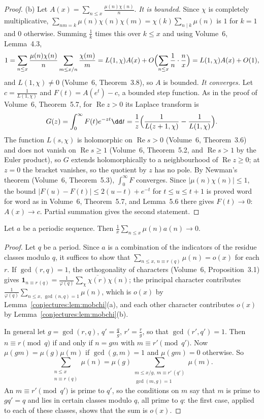 \begin{proof}
(b) Let $A(x)=\sum_{n\le x}\frac{\mu(n)\chi(n)}n$. \emph{It is bounded.} Since $\chi$ is completely multiplicative, $\sum_{nm=k}\mu(n)\chi(n)\chi(m)=\chi(k)\sum_{n\mid k}\mu(n)$
is $1$ for $k=1$ and $0$ otherwise. Summing $\frac1k$ times this over $k\le x$ and using Volume~6, Lemma~4.3,
\[
1=\sum_{n\le x}\frac{\mu(n)\chi(n)}n\sum_{m\le x/n}\frac{\chi(m)}m=L(1,\chi)A(x)+O\Bigl(\sum_{n\le x}\frac1n\cdot\frac nx\Bigr)=L(1,\chi)A(x)+O(1),
\]
and $L(1,\chi)\ne0$ (Volume~6, Theorem~3.8), so $A$ is bounded. \emph{It converges.} Let $c=\frac1{L(1,\chi)}$ and $F(t)=A(e^t)-c$, a bounded step function. As in the proof
of Volume~6, Theorem~5.7, for $\operatorname{Re}z>0$ its Laplace transform is
\[
G(z)=\int_0^\infty F(t)e^{-zt}\dd t=\frac1z\Bigl(\frac1{L(z+1,\chi)}-\frac1{L(1,\chi)}\Bigr).
\]
The function $L(s,\chi)$ is holomorphic on $\operatorname{Re}s>0$ (Volume~6, Theorem~3.6) and does not vanish on $\operatorname{Re}s\ge1$ (Volume~6, Theorem~5.2, and
$\operatorname{Re}s>1$ by the Euler product), so $G$ extends holomorphically to a neighbourhood of $\operatorname{Re}z\ge0$; at $z=0$ the bracket vanishes, so the
quotient by $z$ has no pole. By Newman's theorem (Volume~6, Theorem~5.3), $\int_0^\infty F$ converges. Since $|\mu(n)\chi(n)|\le1$, the bound
$|F(u)-F(t)|\le2(u-t)+e^{-t}$ for $t\le u\le t+1$ is proved word for word as in Volume~6, Theorem~5.7, and Lemma~5.6 there gives $F(t)\to0$: $A(x)\to c$. Partial
summation gives the second statement.
\end{proof}

\begin{proposition}\label{conjectures:prop:mobperiodic}
Let $a$ be a periodic sequence. Then $\frac1x\sum_{n\le x}\mu(n)a(n)\to0$.
\end{proposition}
\begin{proof}
Let $q$ be a period. Since $a$ is a combination of the indicators of the residue classes modulo $q$, it suffices to show that
$\sum_{n\le x,\,n\equiv r\,(q)}\mu(n)=o(x)$ for each $r$. If $\gcd(r,q)=1$, the orthogonality of characters (Volume~6, Proposition~3.1) gives
$\mathbf1_{n\equiv r\,(q)}=\frac1{\varphi(q)}\sum_\chi\overline{\chi(r)}\chi(n)$; the principal character contributes $\frac1{\varphi(q)}\sum_{n\le x,\,\gcd(n,q)=1}\mu(n)$,
which is $o(x)$ by Lemma~\ref{conjectures:lem:mobchi}(a), and each other character contributes $o(x)$ by Lemma~\ref{conjectures:lem:mobchi}(b).

In general let $g=\gcd(r,q)$, $q'=\frac qg$, $r'=\frac rg$, so that $\gcd(r',q')=1$. Then $n\equiv r\pmod q$ if and only if $n=gm$ with $m\equiv r'\pmod{q'}$.
Now $\mu(gm)=\mu(g)\mu(m)$ if $\gcd(g,m)=1$ and $\mu(gm)=0$ otherwise. So
\[
\sum_{\substack{n\le x\\n\equiv r\,(q)}}\mu(n)=\mu(g)\sum_{\substack{m\le x/g,\ m\equiv r'\,(q')\\\gcd(m,g)=1}}\mu(m).
\]
An $m\equiv r'\pmod{q'}$ is prime to $q'$, so the conditions on $m$ say that $m$ is prime to $gq'=q$ and lies in certain classes modulo $q$, all prime to $q$:
the first case, applied to each of these classes, shows that the sum is $o(x)$.
\end{proof}


